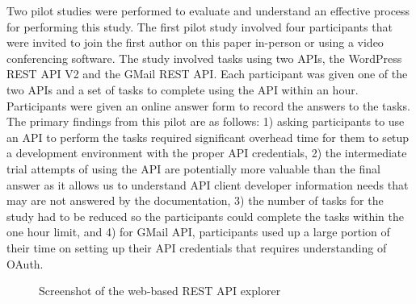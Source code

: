 \documentclass[conference]{IEEEtran}
\begin{document}
Two pilot studies were performed to evaluate and understand an effective process for performing this study. The first pilot study involved four participants that were invited to join the first author on this paper in-person or using a video conferencing software. The study involved tasks using two APIs, the WordPress REST API V2 and the GMail REST API. Each participant was given one of the two APIs and a set of tasks to complete using the API within an hour. Participants were given an online answer form to record the answers to the tasks. The primary findings from this pilot are as follows: 1) asking participants to use an API to perform the tasks required significant overhead time for them to setup a development environment with the proper API credentials, 2) the intermediate trial attempts of using the API are potentially more valuable than the final answer as it allows us to understand API client developer information needs that may are not answered by the documentation, 3) the number of tasks for the study had to be reduced so the participants could complete the tasks within the one hour limit, and 4) for GMail API, participants used up a large portion of their time on setting up their API credentials that requires understanding of OAuth.


\begin{figure}[t]
\begin{center}
\end{center}
\caption{Screenshot of the web-based REST API explorer}
\label{fig:api_explorer}
\end{figure}
\end{document}
